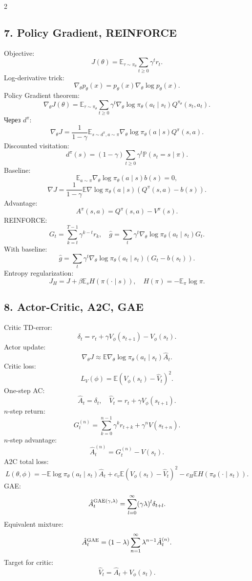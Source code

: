 \documentclass[8pt,a4paper]{extarticle}
\newcommand{\E}{\mathbb E}
\renewcommand{\Prob}{\mathbb P}
\newcommand{\1}{\mathbf 1}
\begin{document}
\begin{multicols*}{2}
\subsection*{7. Policy Gradient, REINFORCE}
Objective:
\[
J(\theta)=\E_{\tau\sim\pi_\theta}\sum_{t\ge0}\gamma^t r_t.
\]
Log-derivative trick:
\[
\nabla_\theta p_\theta(x)=p_\theta(x)\nabla_\theta\log p_\theta(x).
\]
Policy Gradient theorem:
\[
\nabla_\theta J(\theta)=\E_{\tau\sim\pi_\theta}\sum_{t\ge0}\gamma^t\nabla_\theta\log\pi_\theta(a_t\mid s_t)Q^{\pi_\theta}(s_t,a_t).
\]
Через $d^\pi$:
\[
\nabla_\theta J=\frac1{1-\gamma}\E_{s\sim d^\pi,a\sim\pi}\nabla_\theta\log\pi_\theta(a\mid s)Q^\pi(s,a).
\]
Discounted visitation:
\[
d^\pi(s)=(1-\gamma)\sum_{t\ge0}\gamma^t\Prob(s_t=s\mid\pi).
\]
Baseline:
\[
\E_{a\sim\pi}\nabla_\theta\log\pi_\theta(a\mid s)b(s)=0,
\]
\[
\nabla J=\frac1{1-\gamma}\E\nabla\log\pi_\theta(a\mid s)(Q^\pi(s,a)-b(s)).
\]
Advantage:
\[
A^\pi(s,a)=Q^\pi(s,a)-V^\pi(s).
\]
REINFORCE:
\[
G_t=\sum_{k=t}^{T-1}\gamma^{k-t}r_k,
\quad
\hat g=\sum_t \gamma^t\nabla_\theta\log\pi_\theta(a_t\mid s_t)G_t.
\]
With baseline:
\[
\hat g=\sum_t\gamma^t\nabla_\theta\log\pi_\theta(a_t\mid s_t)(G_t-b(s_t)).
\]
Entropy regularization:
\[
J_H=J+\beta\E_s H(\pi(\cdot\mid s)),
\quad H(\pi)=-\E_\pi\log\pi.
\]

\subsection*{8. Actor-Critic, A2C, GAE}
Critic TD-error:
\[
\delta_t=r_t+\gamma V_\phi(s_{t+1})-V_\phi(s_t).
\]
Actor update:
\[
\nabla_\theta J\approx \E\nabla_\theta\log\pi_\theta(a_t\mid s_t)\hat A_t.
\]
Critic loss:
\[
L_V(\phi)=\E\left(V_\phi(s_t)-\hat V_t\right)^2.
\]
One-step AC:
\[
\hat A_t=\delta_t,
\quad \hat V_t=r_t+\gamma V_\phi(s_{t+1}).
\]
$n$-step return:
\[
G_t^{(n)}=\sum_{k=0}^{n-1}\gamma^k r_{t+k}+\gamma^n V(s_{t+n}).
\]
$n$-step advantage:
\[
\hat A_t^{(n)}=G_t^{(n)}-V(s_t).
\]
A2C total loss:
\[
L(\theta,\phi)=-\E\log\pi_\theta(a_t\mid s_t)\hat A_t+c_v\E(V_\phi(s_t)-\hat V_t)^2-c_H\E H(\pi_\theta(\cdot\mid s_t)).
\]
GAE:
\[
\hat A_t^{\rm GAE(\gamma,\lambda)}=\sum_{l=0}^{\infty}(\gamma\lambda)^l\delta_{t+l}.
\]
Equivalent mixture:
\[
\hat A_t^{\rm GAE}=(1-\lambda)\sum_{n=1}^{\infty}\lambda^{n-1}\hat A_t^{(n)}.
\]
Target for critic:
\[
\hat V_t=\hat A_t+V_\phi(s_t).
\]


\end{multicols*}
\end{document}
